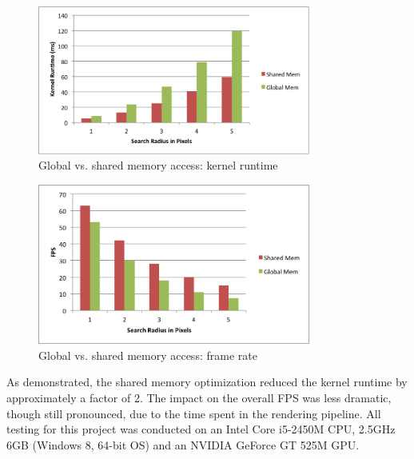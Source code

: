 \documentclass{jcgt}
\begin{document}
\begin{figure}[htb]
  \centering
   \includegraphics[width=0.8\textwidth]{../../performance/SharedVsGlobalRuntime.png}
   \caption{\label{fig:runtime}
    Global vs. shared memory access: kernel runtime}
\end{figure}

\begin{figure}[htb]
  \centering
   \includegraphics[width=0.8\textwidth]{../../performance/SharedVsGlobalFPS.png}
   \caption{\label{fig:fps}
    Global vs. shared memory access: frame rate}
\end{figure}

As demonstrated, the shared memory optimization reduced the kernel runtime by approximately a factor of 2. The impact on the overall FPS was less dramatic, though still pronounced, due to the time spent in the rendering pipeline. All testing for this project was conducted on an Intel Core i5-2450M CPU, 2.5GHz 6GB (Windows 8, 64-bit OS) and an NVIDIA GeForce GT 525M GPU.


%
\small


\end{document}
